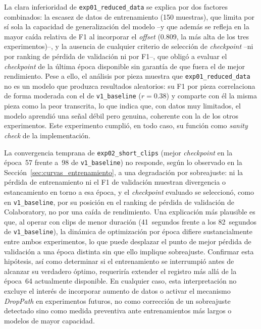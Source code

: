 La clara inferioridad de \texttt{exp01\_reduced\_data} se explica por
dos factores combinados: la escasez de datos de entrenamiento (150
muestras), que limita por sí sola la capacidad de generalización del
modelo --y que además se refleja en la mayor caída relativa de F1 al
incorporar el \textit{offset} (0.809, la más alta de los tres
experimentos)--, y la ausencia de cualquier criterio de selección de
\textit{checkpoint} --ni por ranking de pérdida de validación ni por
F1--, que obligó a evaluar el \textit{checkpoint} de la última época
disponible sin garantía de que fuera el de mejor rendimiento. Pese a
ello, el análisis por pieza muestra que \texttt{exp01\_reduced\_data}
no es un modelo que produzca resultados aleatorios: su F1 por pieza
correlaciona de forma moderada con el de \texttt{v1\_baseline}
($r = 0.38$) y comparte con él la misma pieza como la peor transcrita,
lo que indica que, con datos muy limitados, el modelo aprendió una
señal débil pero genuina, coherente con la de los otros experimentos.
Este experimento cumplió, en todo caso, su función como
\textit{sanity check} de la implementación.\clearpage

La convergencia temprana de \texttt{exp02\_short\_clips} (mejor
\textit{checkpoint} en la época~57 frente a~98 de
\texttt{v1\_baseline}) no responde, según lo observado en la
Sección~\ref{sec:curvas_entrenamiento}, a una degradación por
sobreajuste: ni la pérdida de entrenamiento ni el F1 de validación
muestran divergencia o estancamiento en torno a esa época, y el
\textit{checkpoint} evaluado se seleccionó, como en
\texttt{v1\_baseline}, por su posición en el ranking de pérdida de
validación de Colaboratory, no por una caída de rendimiento. Una
explicación más plausible es que, al operar con clips de menor
duración (41~segundos frente a los 82~segundos de
\texttt{v1\_baseline}), la dinámica de optimización por época difiere
sustancialmente entre ambos experimentos, lo que puede desplazar el
punto de mejor pérdida de validación a una época distinta sin que
ello implique sobreajuste. Confirmar esta hipótesis, así como
determinar si el entrenamiento se interrumpió antes de alcanzar su
verdadero óptimo, requeriría extender el registro más allá de la
época~64 actualmente disponible. En cualquier caso, esta
interpretación no excluye el interés de incorporar aumento de datos o
activar el mecanismo \textit{DropPath} en experimentos futuros, no
como corrección de un sobreajuste detectado sino como medida
preventiva ante entrenamientos más largos o modelos de mayor
capacidad.

